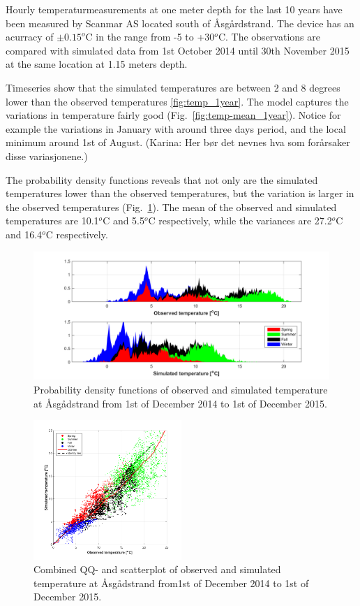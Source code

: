 \documentclass[12pt,a4paper,english]{article}
\begin{document}
Hourly temperaturmeasurements at one meter depth for the last 10 years have been measured by Scanmar AS located south of \AA sg\aa rdstrand. The device has an acurracy of $\pm 0.15^o$C in the range from -5 to +30$^o$C. The observations are compared with simulated data from 1st October 2014 until 30th November 2015 at the same location at 1.15 meters depth.

Timeseries show that the simulated temperatures are between 2 and 8 degrees lower than the observed temperatures \ref{fig:temp_1year}. The model captures the variations in temperature fairly good (Fig.~\ref{fig:temp-mean_1year}). Notice for example the variations in January with around three days period, and the local minimum around 1st of August. (Karina: Her b\o r det nevnes hva som for\aa rsaker disse variasjonene.)

The probability density functions reveals that not only are the simulated temperatures lower than the observed temperatures, but the variation is larger in the observed temperatures (Fig.~\ref{fig:temp-PDF}). The mean of the observed and simulated temperatures are 10.1$^o$C and 5.5$^o$C respectively, while the variances are 27.2$^o$C and 16.4$^o$C respectively.


\begin{figure}[t]
\centerline{
\includegraphics*[trim=1cm 0cm 1cm 0cm,clip=true,width=\textwidth]{Figurer/Temperatur_PDF_arstid}}
\caption{\small
Probability density functions of observed and simulated temperature at \AA sg\aa dstrand from 1st of December 2014 to 1st of December 2015.}
\label{fig:temp-PDF}
\end{figure}

\begin{figure}[t]
\centerline{
\includegraphics*[trim=0cm 0cm 0cm 0cm,clip=true,width=0.5\textwidth]{Figurer/Temperatur_QQ_scatter}}
\caption{\small
Combined QQ- and scatterplot of observed and simulated temperature at \AA sg\aa dstrand from1st of December 2014 to 1st of December 2015.}
\label{fig:temp-QQ_scatter}
\end{figure}
\end{document}
